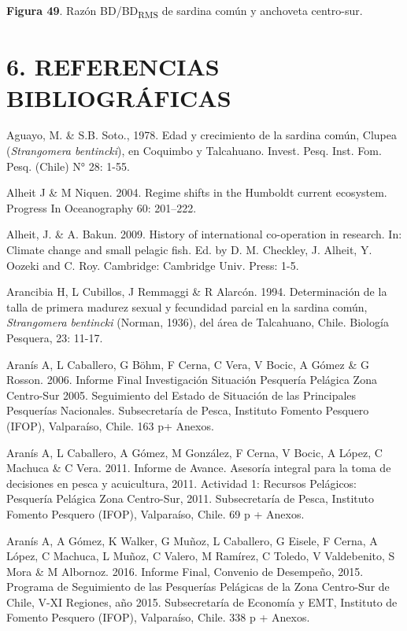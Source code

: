 \documentclass[
  spanish,
]{article}
\begin{document}
\small

\textbf{Figura 49}. Razón BD/BD\textsubscript{RMS} de sardina común y
anchoveta centro-sur. \vspace{0.5cm} \normalsize

\pagebreak

\hypertarget{referencias-bibliogruxe1ficas}{%
\section{6. REFERENCIAS
BIBLIOGRÁFICAS}\label{referencias-bibliogruxe1ficas}}

Aguayo, M. \& S.B. Soto., 1978. Edad y crecimiento de la sardina común,
Clupea (\emph{Strangomera bentincki}), en Coquimbo y Talcahuano. Invest.
Pesq. Inst. Fom. Pesq. (Chile) N° 28: 1-55.

Alheit J \& M Niquen. 2004. Regime shifts in the Humboldt current
ecosystem. Progress In Oceanography 60: 201--222.

Alheit, J. \& A. Bakun. 2009. History of international co-operation in
research. In: Climate change and small pelagic fish. Ed. by D. M.
Checkley, J. Alheit, Y. Oozeki and C. Roy. Cambridge: Cambridge Univ.
Press: 1-5.

Arancibia H, L Cubillos, J Remmaggi \& R Alarcón. 1994. Determinación de
la talla de primera madurez sexual y fecundidad parcial en la sardina
común, \emph{Strangomera bentincki} (Norman, 1936), del área de
Talcahuano, Chile. Biología Pesquera, 23: 11-17.

Aranís A, L Caballero, G Böhm, F Cerna, C Vera, V Bocic, A Gómez \& G
Rosson. 2006. Informe Final Investigación Situación Pesquería Pelágica
Zona Centro-Sur 2005. Seguimiento del Estado de Situación de las
Principales Pesquerías Nacionales. Subsecretaría de Pesca, Instituto
Fomento Pesquero (IFOP), Valparaíso, Chile. 163 p+ Anexos.

Aranís A, L Caballero, A Gómez, M González, F Cerna, V Bocic, A López, C
Machuca \& C Vera. 2011. Informe de Avance. Asesoría integral para la
toma de decisiones en pesca y acuicultura, 2011. Actividad 1: Recursos
Pelágicos: Pesquería Pelágica Zona Centro-Sur, 2011. Subsecretaría de
Pesca, Instituto Fomento Pesquero (IFOP), Valparaíso, Chile. 69 p +
Anexos.

Aranís A, A Gómez, K Walker, G Muñoz, L Caballero, G Eisele, F Cerna, A
López, C Machuca, L Muñoz, C Valero, M Ramírez, C Toledo, V Valdebenito,
S Mora \& M Albornoz. 2016. Informe Final, Convenio de Desempeño, 2015.
Programa de Seguimiento de las Pesquerías Pelágicas de la Zona
Centro-Sur de Chile, V-XI Regiones, año 2015. Subsecretaría de Economía
y EMT, Instituto de Fomento Pesquero (IFOP), Valparaíso, Chile. 338 p +
Anexos.
\end{document}
